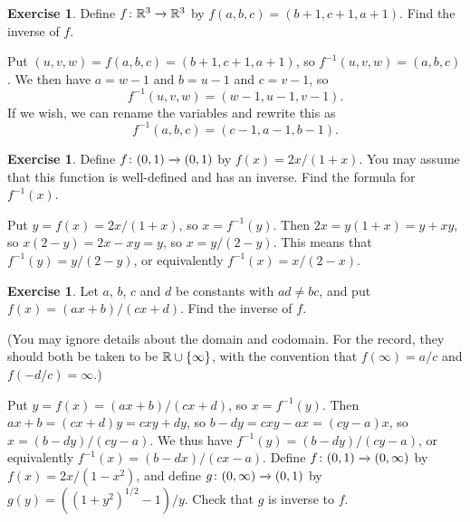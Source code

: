 \documentclass[a4paper]{book}
\theoremstyle{definition}
\newtheorem{exercise}[theorem]{Exercise}
\newenvironment{starex}{
 \renewcommand{\thetheorem}{\arabic{chapter}.\arabic{section}.\arabic{theorem}${}^*$}
 \exercise
}{\endexercise}
\renewenvironment{solution}{\SolutionInline}{\endSolutionInline}
\begin{document}
\begin{exercise}
 Define $f\colon{\mathbb{R}}^3\xrightarrow{}{\mathbb{R}}^3$ by $f(a,b,c)=(b+1,c+1,a+1)$.  Find the
 inverse of $f$.  
\end{exercise}
\begin{solution}
 Put $(u,v,w)=f(a,b,c)=(b+1,c+1,a+1)$, so $f^{-1}(u,v,w)=(a,b,c)$.  We
 then have $a=w-1$ and $b=u-1$ and $c=v-1$, so 
 \[ f^{-1}(u,v,w) = (w-1,u-1,v-1). \]
 If we wish, we can rename the variables and rewrite this as
 \[ f^{-1}(a,b,c) = (c-1,a-1,b-1). \]
\end{solution}


\begin{exercise}
 Define $f\colon(0,1)\xrightarrow{}(0,1)$ by $f(x)=2x/(1+x)$.  You may assume that
 this function is well-defined and has an inverse.  Find the formula
 for $f^{-1}(x)$.
\end{exercise}
\begin{solution}
 Put $y=f(x)=2x/(1+x)$, so $x=f^{-1}(y)$.  Then $2x=y(1+x)=y+xy$, so
 $x(2-y)=2x-xy=y$, so $x=y/(2-y)$.  This means that
 $f^{-1}(y)=y/(2-y)$, or equivalently $f^{-1}(x)=x/(2-x)$.
\end{solution}
\begin{exercise}
 Let $a$, $b$, $c$ and $d$ be constants with $ad\neq bc$, and put
 $f(x)=(ax+b)/(cx+d)$.  Find the inverse of $f$.

 (You may ignore details about the domain and codomain.  For the
 record, they should both be taken to be ${\mathbb{R}}\cup\{\infty\}$, with the
 convention that $f(\infty)=a/c$ and $f(-d/c)=\infty$.)
\end{exercise}
\begin{solution}
 Put $y=f(x)=(ax+b)/(cx+d)$, so $x=f^{-1}(y)$.  Then
 $ax+b=(cx+d)y=cxy+dy$, so $b-dy=cxy-ax=(cy-a)x$, so
 $x=(b-dy)/(cy-a)$.  We thus have $f^{-1}(y)=(b-dy)/(cy-a)$, or
 equivalently $f^{-1}(x)=(b-dx)/(cx-a)$.
\end{solution}
\begin{starex}
 Define $f\colon(0,1)\xrightarrow{}(0,\infty)$ by $f(x)=2x/(1-x^2)$, and define
 $g\colon(0,\infty)\xrightarrow{}(0,1)$ by $g(y)=((1+y^2)^{1/2}-1)/y$.  Check that
 $g$ is inverse to $f$.
\end{starex}
\end{document}
